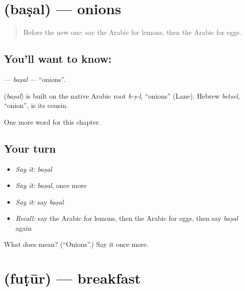 \section[\texorpdfstring{\ar{بصل} (baṣal)}{بصل (baṣal)}]{ (baṣal) — onions}

\label{lesson:AR-C68-basal}



\begin{quote}
Before the new one: say the Arabic for lemons, then the Arabic for eggs.
\end{quote}

\subsection*{You'll want to know: }
\textbf{} — \emph{baṣal} — \textquotedblleft{}onions\textquotedblright{}.

\begin{cousinweb}
\textbf{} (\emph{baṣal}) is built on the native Arabic root \emph{b-ṣ-l}, \textquotedblleft{}onions\textquotedblright{} (Lane). Hebrew \emph{betsel}, \textquotedblleft{}onion\textquotedblright{}, is its cousin.
\end{cousinweb}

\begin{grammarlens}[title={What you've built}]
One more word for this chapter.
\end{grammarlens}

\subsection*{Your turn}
\begin{itemize}
\raggedright
  \item \emph{Say it:} \emph{baṣal}
  \item \emph{Say it:} \emph{baṣal}, once more
  \item \emph{Say it:} say \emph{baṣal}
  \item \emph{Recall:} say the Arabic for lemons, then the Arabic for eggs, then say \emph{baṣal} again
\end{itemize}

\begin{tcolorbox}[breakable,colback=teal!4,colframe=teal!35!black,title={Before you move on}]
What does  mean? (\textquotedblleft{}Onions\textquotedblright{}.) Say it once more.
\end{tcolorbox}
\section[\texorpdfstring{\ar{فطور} (fuṭūr)}{فطور (fuṭūr)}]{ (fuṭūr) — breakfast}

